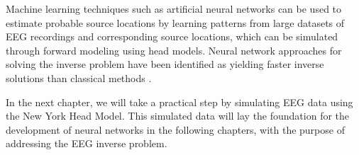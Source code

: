 \documentclass[a4paper, UKenglish, 11pt]{uiomaster}
\begin{document}
Machine learning techniques such as artificial neural networks can be used to estimate probable source locations by learning patterns from large datasets of EEG recordings and corresponding source locations, which can be simulated through forward modeling using head models. Neural network approaches for solving the inverse problem have been identified as yielding faster inverse solutions than classical methods \cite{sclabassi2001eeg}.

In the next chapter, we will take a practical step by simulating EEG data using the New York Head Model. This simulated data will lay the foundation for the development of neural networks in the following chapters, with the purpose of addressing the EEG inverse problem.
\end{document}
